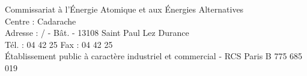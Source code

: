 {  \vspace{49mm}

  \begin{flushleft}
    \fontsize{6}{7}\selectfont%
    Commissariat \`a l'\'Energie Atomique et aux \'Energies Alternatives\\
    Centre : Cadarache\\
    Adresse : \Prodepartement/\Proservice\ifthenelse{\isundefined{\Prolaboratoiretitre}}{}{/\Prolaboratoire} - B\^at. {\Probatiment} - 13108 Saint Paul Lez Durance\\
    T\'el. : 04 42 25 {\Protelephone} \hspace{2.5mm} Fax : 04 42 25 {\Profax} \\
    \'Etablissement public \`a caract\`ere industriel et commercial - RCS Paris B 775 685 019
  \end{flushleft}

  \newpage
}


